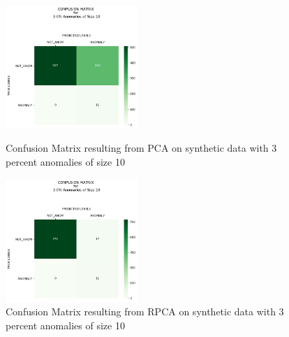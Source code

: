\documentclass{article}
\begin{document}
\begin{figure}[H]
\begin{minipage}[b]{0.45\linewidth}
    \centering

    \includegraphics[width=50mm, scale=0.5]{cmPCATest_120AnomSize10.jpg}
    \caption{Confusion Matrix resulting from PCA on synthetic data with 3 percent anomalies of size 10}
    \label{fig::CMtrainPCA12010}
\end{minipage}
\quad
\begin{minipage}[b]{0.45\linewidth}
    \centering
    \includegraphics[width=50mm, scale=0.5]{cmRPCATest_120AnomSize10.jpg}
    \caption{Confusion Matrix resulting from RPCA on synthetic data with 3 percent anomalies of size 10}
    \label{fig::CMtrainRPCA12010}
\end{minipage}
\end{figure}

\end{document}
